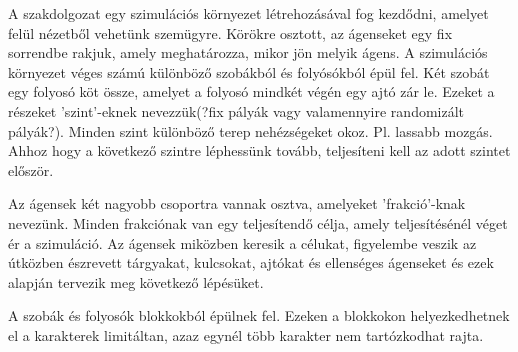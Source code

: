 
A szakdolgozat egy szimulációs környezet létrehozásával fog kezdődni, amelyet felül nézetből vehetünk szemügyre.
Körökre osztott, az ágenseket egy fix sorrendbe rakjuk, amely meghatározza, mikor jön melyik ágens.
A szimulációs környezet véges számú különböző szobákból és folyósókból épül fel. Két szobát egy folyosó köt össze, amelyet a folyosó mindkét végén egy ajtó zár le.
Ezeket a részeket 'szint'-eknek nevezzük(?fix pályák vagy valamennyire randomizált pályák?). Minden szint különböző terep nehézségeket okoz. Pl. lassabb mozgás. 
Ahhoz hogy a következő szintre léphessünk tovább, teljesíteni kell az adott szintet először.

Az ágensek két nagyobb csoportra vannak osztva, amelyeket 'frakció'-knak nevezünk. Minden frakciónak van egy teljesítendő célja, amely teljesítésénél véget ér a szimuláció.
Az ágensek miközben keresik a célukat, figyelembe veszik az útközben észrevett tárgyakat, kulcsokat, ajtókat és ellenséges ágenseket és ezek alapján tervezik meg következő lépésüket.

A szobák és folyosók blokkokból épülnek fel. Ezeken a blokkokon helyezkedhetnek el a karakterek limitáltan, azaz egynél több karakter nem tartózkodhat rajta.
